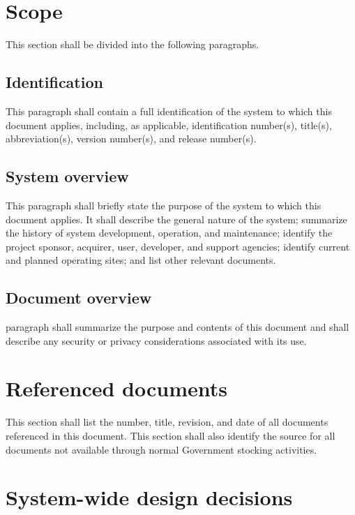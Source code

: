 \documentclass{fidata-report-template}
\begin{document}
\section{Scope}

This section shall be divided into the following paragraphs.

\subsection{Identification}

This paragraph shall contain a full identification of the system to
which this document applies, including, as applicable, identification
number(s), title(s), abbreviation(s), version number(s), and release
number(s).

\subsection{System overview}

This paragraph shall briefly state the purpose of the system to which
this document applies. It shall describe the general nature of the
system; summarize the history of system development, operation, and
maintenance; identify the project sponsor, acquirer, user, developer,
and support agencies; identify current and planned operating sites; and
list other relevant documents.

\subsection{Document overview}

paragraph shall summarize the purpose and contents of this document and
shall describe any security or privacy considerations associated with
its use.

\section{Referenced documents}

This section shall list the number, title, revision, and date of all
documents referenced in this document. This section shall also identify
the source for all documents not available through normal Government
stocking activities.

\section{System-wide design decisions}
\end{document}
